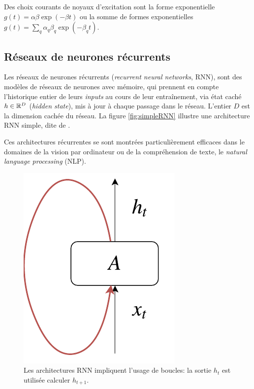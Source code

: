 \documentclass[../main.tex]{subfiles}
\begin{document}
Des choix courants de noyaux d'excitation sont la forme exponentielle $g(t) = \alpha\beta\exp(-\beta t)$ ou la somme de formes exponentielles $g(t) = \sum_q \alpha_q\beta_q\exp(-\beta_q t)$.

\subsection{Réseaux de neurones récurrents}

Les réseaux de neurones récurrents (\textit{recurrent neural networks}, RNN), sont des modèles de réseaux de neurones avec mémoire, qui prennent en compte l'historique entier de leurs \textit{inputs} au cours de leur entraînement, via état caché $h\in\mathbb{R}^D$ (\textit{hidden state}), mis à jour à chaque passage dans le réseau. L'entier $D$ est la dimension cachée du réseau. La figure \autoref{fig:simpleRNN} illustre une architecture RNN simple, dite de \citeauthor{elman1990srnn} \cite{elman1990srnn}.

Ces architectures récurrentes se sont montrées particulièrement efficaces dans le domaines de la vision par ordinateur ou de la compréhension de texte, le \textit{natural language processing} (NLP). \cite{unreasonableEffectivenessRNN}

\begin{figure}[!ht]
	\centering
	\includegraphics[height=0.2\textheight]{diagrams/rnn.pdf}
	\caption{Les architectures RNN impliquent l'usage de boucles: la sortie $h_t$ est utilisée calculer $h_{t+1}$.}\label{fig:simpleRNN}
\end{figure}
\end{document}
